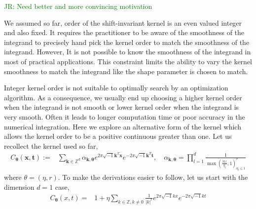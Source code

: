 \documentclass{iitthesis}          %
\newcommand{\bm}[1]{\boldsymbol{#1}}
\newcommand{\vtheta}{{\bm{\theta}}}
\newcommand{\vk}{\bm{k}}
\newcommand{\vt}{\bm{t}}
\newcommand{\vx}{\bm{x}}
\def\abs#1{\ensuremath{\left \lvert #1 \right \rvert}}
\newcommand{\JRNote}[1]{{\textcolor{green}{JR: #1}}}
\begin{document}
\JRNote{Need better and more convincing motivation}

We assumed so far, order of the shift-invariant kernel is an even valued integer and also fixed. 
It requires the practitioner to be aware of the smoothness of the integrand to precisely hand pick the kernel order to match the smoothness of the integrand.
However, It is not possible to know the smoothness of the integrand in most of practical applications. 
This constraint limits the ability to vary the kernel smoothness to match the integrand like the shape parameter is chosen to match. 

Integer kernel order is not suitable to optimally search by an optimization algorithm.
As a consequence, we usually end up choosing a higher kernel order when the integrand is not  smooth or lower kernel order when the integrand is very smooth.
Often it leads to longer computation time or poor accuracy in the numerical integration.
Here we explore an alternative form of the kernel which allows the kernel order to be a positive continuous greater than one. Let us recollect the kernel used so far,
\begin{align*}
C_\vtheta(\vx, \vt) := &  \sum_{\vk \in \mathbb{Z}^d} \alpha_{\vk,\vtheta}  e^{2 \pi\sqrt{-1} \vk^T\vx}
e^{-2 \pi\sqrt{-1} \vk^T\vt}, \quad \alpha_{\vk,\vtheta} = \prod_{l=1}^d \frac{1}{\max(\frac{|k_l|}{\eta_l},1)^r_{\eta_l\leq 1}} 
\end{align*}
where $\theta = (\eta, r)$.  
To make the derivations easier to follow, let us start with the dimension $d=1$ case,
\begin{align*}
C_\vtheta(x, t) = & 1 + \eta \sum_{k \in \mathbb{Z}, k \neq 0 } \frac{1}{\abs{k}^r} 
e^{ 2 \pi\sqrt{-1} k x}
e^{-2 \pi\sqrt{-1} k t}
\end{align*}
\end{document}
